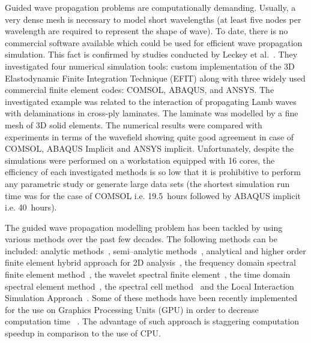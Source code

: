 \documentclass[runningheads]{llncs}
\newcommand{\etal}{et al.}
\begin{document}
Guided wave propagation problems are computationally demanding.
Usually, a very dense mesh is necessary to model short wavelengths (at least five nodes per wavelength are required to represent the shape of wave).
To date, there is no commercial software available which could be used for efficient wave propagation simulation. 
This fact is confirmed by studies conducted by Leckey \etal~\cite{Leckey2018}. 
They investigated four numerical simulation tools: custom implementation of the 3D Elastodynamic Finite Integration Technique (EFIT) \cite{Schubert1998} along with three widely used commercial finite element codes: COMSOL, ABAQUS, and ANSYS. 
The investigated example was related to the interaction of propagating Lamb waves with delaminations in cross-ply laminates. 
The laminate was modelled by a fine mesh of 3D solid elements. 
The numerical results were compared with experiments in terms of the wavefield showing quite good agreement in case of COMSOL, ABAQUS Implicit and ANSYS implicit. 
Unfortunately, despite the simulations were performed on a workstation equipped with 16 cores, the efficiency of each investigated methods is so low that it is prohibitive to perform any parametric study or generate large data sets (the shortest simulation run time was for the case of COMSOL i.e. 19.5~hours followed by ABAQUS implicit i.e. 40~hours).

The guided wave propagation modelling problem has been tackled by using various methods over the past few decades. 
The following methods can be included: analytic methods~\cite{Giurgiutiu2014}, semi--analytic methods~\cite{Bartoli2006,Gravenkamp2014},  analytical and higher order finite element hybrid approach for 2D analysis~\cite{Vivar-Perez2014}, the frequency domain spectral finite element method~\cite{Doyle1989,RoyMahapatra2003},  the wavelet spectral finite element~\cite{Mitra2008,Yang2016}, the time domain spectral element method~\cite{Schulte2010,Ostachowicz2012,Lonkar2013}, the spectral cell method~\cite{Duczek2014} and  the Local Interaction Simulation Approach~\cite{Kijanka2013}.
Some of these methods have been recently implemented for the use on Graphics Processing Units (GPU) in order to decrease computation time ~\cite{Kijanka2013,Kudela2016,Shen2017,Mossaiby2019}.
The advantage of such approach is staggering computation speedup in comparison to the use of CPU.
\end{document}
